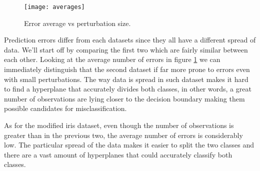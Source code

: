 \begin{figure}[h]
	\centering
	\captionsetup{justification=centering}
	\texttt{[image: averages]}
	\caption{Error average vs perturbation size.}
	\label{averages}
\end{figure}

Prediction errors differ from each datasets since they all have a different spread of data. We'll start off by comparing the first two which are fairly similar between each other. Looking at the average number of errors in figure \ref{averages} we can immediately distinguish that the second dataset if far more prone to errors even with small perturbations. The way data is spread in such dataset makes it hard to find a hyperplane that accurately divides both classes, in other words, a great number of observations are lying closer to the decision boundary making them possible candidates for misclassification.

As for the modified iris dataset, even though the number of observations is  greater than in the previous two, the average number of errors is considerably low. The particular spread of the data makes it easier to split the two classes and there are a vast amount of hyperplanes that could accurately classify both classes.
